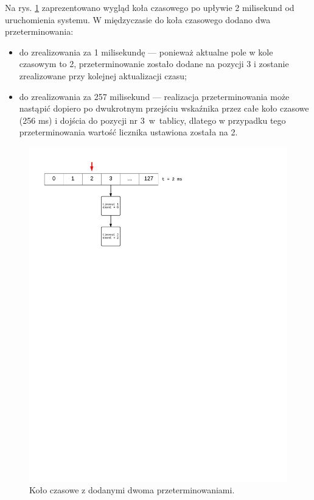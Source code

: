 Na rys. \ref{fig:tiw2} zaprezentowano wygląd koła czasowego po upływie 2 milisekund od uruchomienia systemu.
W międzyczasie do koła czasowego dodano dwa przeterminowania:
\begin{itemize}
\item do zrealizowania za 1 milisekundę --- ponieważ aktualne pole w kole czasowym to 2, przeterminowanie zostało dodane na pozycji 3 i zostanie zrealizowane przy kolejnej aktualizacji czasu;
\item do zrealizowania za 257 milisekund --- realizacja przeterminowania może nastąpić dopiero po dwukrotnym przejściu wskaźnika przez całe koło czasowe (256 ms) i dojścia do pozycji nr 3~w~tablicy, dlatego w przypadku tego przeterminowania wartość licznika ustawiona została na 2.
\end{itemize}

\begin{figure}[h]
\centerline{\includegraphics[scale=0.75, clip, trim=10mm 195mm 80mm 10mm]{tiw2}}
\caption{Koło czasowe z dodanymi dwoma przeterminowaniami.}
\label{fig:tiw2}
\end{figure}

